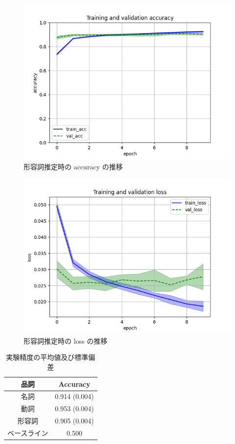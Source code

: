 \documentclass[twocolumn]{jarticle}
\begin{document}
\begin{figure}[tbp]
      \includegraphics[width=\linewidth]{keiyoushi_acc.png}
      \caption{形容詞推定時の accuracy の推移}
      \label{fig:kei_acc}
\end{figure}
\begin{figure}[tbp]
      \includegraphics[width=\linewidth]{keiyoushi_loss.png}
      \caption{形容詞推定時の loss の推移}
      \label{fig:kei_loss}
\end{figure}



\begin{table}[t]
	\caption{実験精度の平均値及び標準偏差}
    \begin{center}
	\begin{tabular}{| c |  c |} \hline
  品詞 & Accuracy \\ \hline \hline
  名詞 & 0.914 (0.004) \\ %
  動詞 & 0.953 (0.004) \\
  形容詞 & 0.905 (0.004) \\
  ベースライン & 0.500 \\ \hline
	\end{tabular}
    \end{center}
	\label{tb:2}
\end{table}
\end{document}

